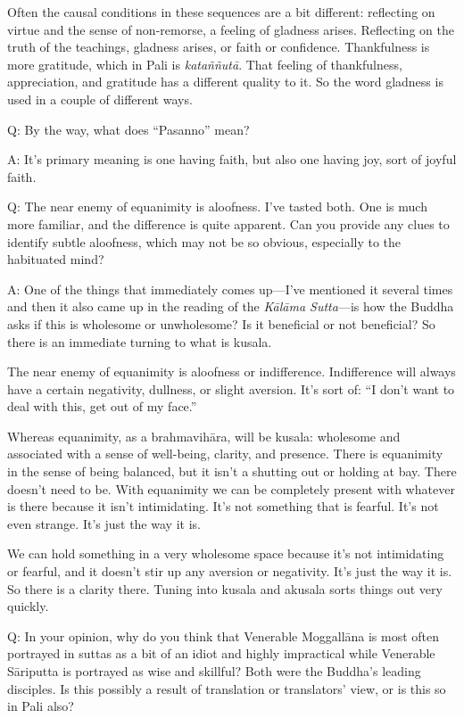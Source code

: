 Often the causal conditions in these sequences are a bit different:
reflecting on virtue and the sense of non-remorse, a feeling of gladness
arises. Reflecting on the truth of the teachings, gladness arises, or
faith or confidence. Thankfulness is more gratitude, which in Pali is
\emph{kataññutā}. That feeling of thankfulness, appreciation, and
gratitude has a different quality to it. So the word gladness is used in
a couple of different ways.

\qaspace
Q: By the way, what does “Pasanno” mean?

\qaspace
A: It’s primary meaning is one having faith, but also one having joy,
sort of joyful faith.

\qaspace
Q: The near enemy of equanimity is aloofness. I’ve tasted both. One is
much more familiar, and the difference is quite apparent. Can you
provide any clues to identify subtle aloofness, which may not be so
obvious, especially to the habituated mind?

\qaspace
A: One of the things that immediately comes up—I’ve mentioned it several
times and then it also came up in the reading of the \emph{Kālāma
Sutta}—is how the Buddha asks if this is wholesome or unwholesome? Is it
beneficial or not beneficial? So there is an immediate turning to what
is kusala.

The near enemy of equanimity is aloofness or indifference. Indifference
will always have a certain negativity, dullness, or slight aversion.
It’s sort of: “I don’t want to deal with this, get out of my face.”

Whereas equanimity, as a brahmavihāra, will be kusala: wholesome and
associated with a sense of well-being, clarity, and presence. There is
equanimity in the sense of being balanced, but it isn’t a shutting out
or holding at bay. There doesn’t need to be. With equanimity we can be
completely present with whatever is there because it isn’t intimidating.
It’s not something that is fearful. It’s not even strange. It’s just the
way it is.

We can hold something in a very wholesome space because it’s not
intimidating or fearful, and it doesn’t stir up any aversion or
negativity. It’s just the way it is. So there is a clarity there. Tuning
into kusala and akusala sorts things out very quickly.

\qaspace
Q: In your opinion, why do you think that Venerable Moggallāna is most
often portrayed in suttas as a bit of an idiot and highly impractical
while Venerable Sāriputta is portrayed as wise and skillful? Both were
the Buddha’s leading disciples. Is this possibly a result of translation
or translators’ view, or is this so in Pali also?

